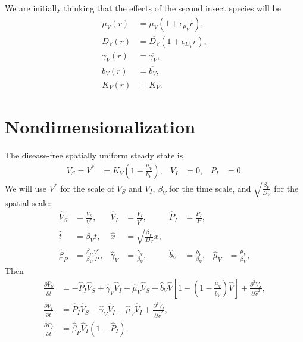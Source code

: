 \documentclass{article}
\begin{document}
We are initially thinking that the effects of the second insect
species will be
\begin{equation}
  \begin{split}
    \mu_V(r) &= \overline{\mu_V} (1 + \epsilon_{\mu_V} r),
    \\
    D_V(r) &= \overline{D_V} (1 + \epsilon_{D_V} r),
    \\
    \gamma_V(r) &= \overline{\gamma_V},
    \\
    b_V(r) &= \overline{b_V},
    \\
    K_V(r) &= \overline{K_V}.
  \end{split}
\end{equation}


\section{Nondimensionalization}

The disease-free spatially uniform steady state is
\begin{align}
  V_S = V^* &= K_V \left(1 - \frac{\mu_V}{b_V}\right),
  &
  V_I &= 0,
  &
  P_I &= 0.
\end{align}
We will use $V^*$ for the scale of $V_S$ and $V_I$, $\beta_V$ for the
time scale, and $\sqrt{\frac{\beta_V}{D_V}}$ for the spatial scale:
\begin{equation}
  \begin{aligned}
    \hat{V}_S &= \frac{V_S}{V^*},
    &
    \hat{V}_I &= \frac{V_I}{V^*},
    &
    \hat{P}_I &= \frac{P_I}{P},
    \\
    \hat{t} &= \beta_V t,
    &
    \hat{x} &= \sqrt{\frac{\beta_V}{D_V}} x,
    \\
    \hat{\beta}_P &= \frac{\beta_P}{\beta_V}\frac{V^*}{P},
    &
    \hat{\gamma}_V &= \frac{\gamma_V}{\beta_V},
    &
    \hat{b}_V &= \frac{b_V}{\beta_V},
    &
    \hat{\mu}_V &= \frac{\mu_V}{\beta_V},
  \end{aligned}
\end{equation}
Then
\begin{equation}
  \label{pdesystem}
  \begin{split}
    \frac{\partial \hat{V}_S}{\partial \hat{t}}
    &= - \hat{P}_I \hat{V}_S
    + \hat{\gamma}_V \hat{V}_I
    - \hat{\mu}_V \hat{V}_S
    + \hat{b}_V \hat{V} \left[1 - \left(1 - \frac{\hat{\mu}_V}{\hat{b}_V}\right) \hat{V}\right]
    + \frac{\partial^2 \hat{V}_S}{\partial \hat{x}^2},
    \\
    \frac{\partial \hat{V}_I}{\partial \hat{t}}
    &= \hat{P}_I \hat{V}_S
    - \hat{\gamma}_V \hat{V}_I
    - \hat{\mu}_V \hat{V}_I
    + \frac{\partial^2 \hat{V}_I}{\partial \hat{x}^2},
    \\
    \frac{\partial \hat{P}_I}{\partial \hat{t}}
    &= \hat{\beta}_P \hat{V}_I (1 - \hat{P}_I).
  \end{split}
\end{equation}
\end{document}
